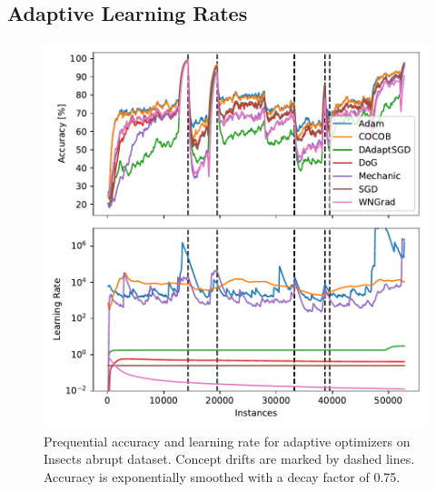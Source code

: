 \documentclass[letterpaper]{article} %
\begin{document}
\subsection{Adaptive Learning Rates}

\begin{figure}[hb]
	\centering
	\includegraphics[width=.47\textwidth]{figures/lr_norms_optims_insects_abrupt.pdf}
	\caption{Prequential accuracy and learning rate for adaptive optimizers on Insects abrupt dataset. Concept drifts are marked by dashed lines. Accuracy is exponentially smoothed with a decay factor of 0.75.}
	\label{fig:prequential_optims_insects}
\end{figure}
\end{document}
